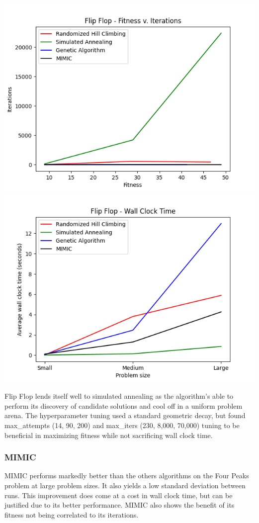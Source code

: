 \documentclass{article}
\begin{document}
\begin{center}
    \includegraphics[width=.49\linewidth]{flip_flop_fitness_iters.png}
    \includegraphics[width=.49\linewidth]{flip_flop_time.png}
\end{center}

Flip Flop lends itself well to simulated annealing as the algorithm's able to perform its discovery of candidate solutions and cool off in a uniform problem arena. The hyperparameter tuning used a standard geometric decay, but found max\_attempts (14, 90, 200) and max\_iters (230, 8,000, 70,000) tuning to be beneficial in maximizing fitness while not sacrificing wall clock time.

\subsubsection{MIMIC}

MIMIC performs markedly better than the others algorithms on the Four Peaks problem at large problem sizes. It also yields a low standard deviation between runs. This improvement does come at a cost in wall clock time, but can be justified due to its better performance. MIMIC also shows the benefit of its fitness not being correlated to its iterations.
\end{document}
